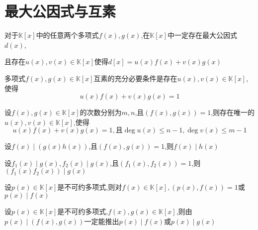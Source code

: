 \section{最大公因式与互素}

\begin{knowledge}[线性表示最小公因式]
    对于$\mathbb{K}[x]$中的任意两个多项式$f(x),g(x)$,在$\mathbb{K}[x]$中一定存在最大公因式$d(x)$,

    且存在$u(x),v(x)\in \mathbb{K}[x]$使得$d[x]=u(x)f(x)+v(x)g(x)$
\end{knowledge}

\begin{knowledge}[互素的充要条件]
    多项式$f(x),g(x)\in \mathbb{K}[x]$互素的充分必要条件是存在$u(x),v(x)\in \mathbb{K}[x]$,使得
    \begin{equation}
        u(x)f(x)+v(x)g(x)=1
    \end{equation}
\end{knowledge}

\begin{knowledge}\label{裴蜀定理}
    设$f(x),g(x)\in \mathbb{K}[x]$的次数分别为$m,n$,且$(f(x),g(x))=1$,则存在唯一的$u(x),v(x)\in \mathbb{K}[x]$,使得
    \begin{equation*}
        u(x)f(x)+v(x)g(x)=1,\mbox{且}\deg u(x)\le n-1,\deg v(x)\le m-1
    \end{equation*}
\end{knowledge}

\begin{knowledge}[互素与整除1]
    设$f(x)\mid (g(x)h(x))$,且$(f(x),g(x))=1$,则$f(x)\mid h(x)$
\end{knowledge}

\begin{knowledge}[互素与整除2]
    设$f_1(x)\mid g(x),f_2(x)\mid g(x)$,且$(f_1(x),f_2(x))=1$,则$(f_1(x)f_2(x))\mid g(x)$
\end{knowledge}

\begin{knowledge}[不可约多项式与整除1]
    设$p(x)\in \mathbb{K}[x]$是不可约多项式,则对$f(x)\in \mathbb{K}[x],(p(x),f(x))=1$或$p(x)\mid f(x)$
\end{knowledge}

\begin{knowledge}[不可约多项式与整除2]
    设$p(x)\in \mathbb{K}[x]$是不可约多项式,$f(x),g(x)\in \mathbb{K}[x]$,则由$p(x)\mid (f(x),g(x))$一定能推出$p(x)\mid f(x)$或$p(x)\mid g(x)$
\end{knowledge}

